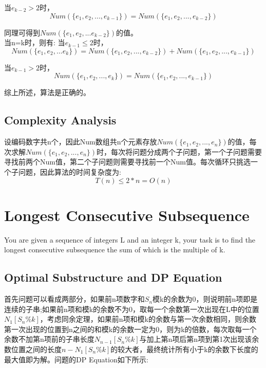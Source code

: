 \documentclass{article}
\begin{document}
\begin{CJK*}{UTF8}{gbsn}
当$e_{k-2} > 2$时，
\begin{equation}
Num(\{e_1,e_2,...,e_{k-1}\}) = Num(\{e_1,e_2,...,e_{k-2}\})
\end{equation}

同理可得到$Num(\{e_1,e_2,...e_{k-2}\})$的值。
\\

当n=k时，则有:
当$e_{k-1} \leq 2$时，
\begin{equation}
Num(\{e_1,e_2,...e_k\})=Num(\{e_1,e_2,...,e_{k-2}\}) + Num(\{e_1,e_2,...,e_{k-1}\})
\end{equation}

当$e_{k-1} > 2$时，
\begin{equation}
Num(\{e_1,e_2,...,e_k\}) = Num(\{e_1,e_2,...,e_{k-1}\})
\end{equation}

综上所述，算法是正确的。

\subsection{Complexity Analysis}

设编码数字共n个，因此Num数组共n个元素存放$Num(\{e_1,e_2,...,e_n\})$的值，每次求解$Num(\{e_1,e_2,...,e_n\})$时，每次将问题分成两个子问题，第一个子问题需要寻找前两个Num值，第二个子问题则需要寻找前一个Num值。每次循环只挑选一个子问题，因此算法的时间复杂度为:
\begin{equation}
T(n) \leq 2*n = O(n)
\end{equation}

\newpage
\section{Longest Consecutive Subsequence}
You are given a sequence of integers L and an integer k, your task is to find the longest consecutive subsequence the sum of which is the multiple of k.



\subsection{Optimal Substructure and DP Equation}

首先问题可以看成两部分，如果前n项数字和$S_n$模k的余数为0，则说明前n项即是连续的子串;如果前n项和模k的余数不为0，取每一个余数第一次出现在L中的位置$N_1[S_n\%k]$，考虑同余定理，如果前n项和模k的余数与第一次余数相同，则余数第一次出现的位置到n之间的和模k的余数一定为0，则为k的倍数，每次取每一个余数不加第n项前的子串长度$N_{n-1}[S_n\%k]$与加上第n项后第n项到第1次出现该余数位置之间的长度$n-N_1[S_n\%k]$的较大者，最终统计所有小于k的余数下长度的最大值即为解。问题的DP Equation如下所示:


\end{CJK*}
\end{document}
